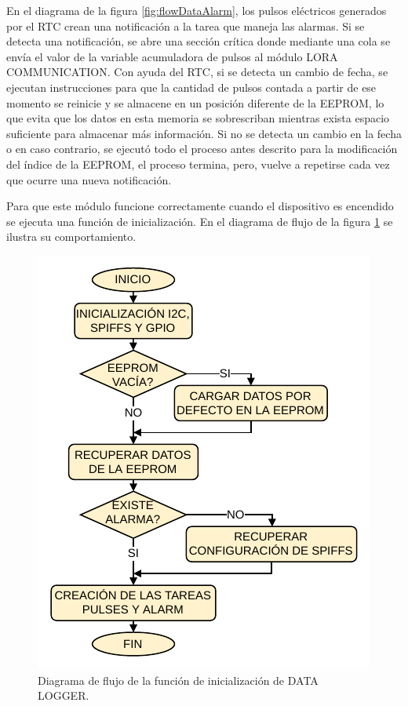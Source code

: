 En el diagrama de la figura \ref{fig:flowDataAlarm}, los pulsos eléctricos generados por el RTC crean una notificación a la tarea que maneja las alarmas. Si se detecta una notificación, se abre una sección crítica donde mediante una cola se envía el valor de la variable acumuladora de pulsos al módulo LORA COMMUNICATION. Con ayuda del RTC, si se detecta un cambio de fecha, se ejecutan instrucciones para que la cantidad de pulsos contada a partir de ese momento se reinicie y se almacene en un posición diferente de la EEPROM, lo que evita que los datos en esta memoria se sobrescriban mientras exista espacio suficiente para almacenar más información. Si no se detecta un cambio en la fecha o en caso contrario, se ejecutó todo el proceso antes descrito para la modificación del índice de la EEPROM, el proceso termina, pero, vuelve a repetirse cada vez que ocurre una nueva notificación.

Para que este módulo funcione correctamente cuando el dispositivo es encendido se ejecuta una función de inicialización. En el diagrama de flujo de la figura \ref{fig:flowDataInit} se ilustra su comportamiento.

\begin{figure}[h]
	\centering
	\includegraphics[scale=1]{./Figures/data_logger_init.pdf}
	\caption{Diagrama de flujo de la función de inicialización de DATA LOGGER.}
		\label{fig:flowDataInit}
\end{figure}

